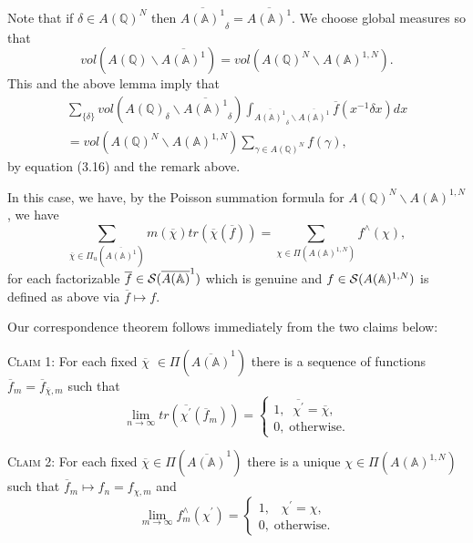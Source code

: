 Note that if $\delta\in A({\mathbb{Q}})^N$ then
$\overline{A({\mathbb{A}})^1}_\delta=\overline{A({\mathbb{A}})^1}$.
We choose global measures so that
\[
vol(A({\mathbb{Q}}) \backslash \overline{A({\mathbb{A}})^1})
=vol(A({\mathbb{Q}})^N \backslash A({\mathbb{A}})^{1,N}).
\]
This and the above lemma imply that 
\begin{equation}
\begin{array}{c}
\sum_{\{\delta \}}
vol(A({\mathbb{Q}})_\delta \backslash \overline{A({\mathbb{A}})^1}_{\delta })
\int_{\overline{A({\mathbb{A}})^1}_{\delta }\backslash 
\overline{A({\mathbb{A}})^1}}
\overline{f}(x^{-1}\delta x)dx \\ 
=vol(A({\mathbb{Q}})^N \backslash A({\mathbb{A}})^{1,N})
\sum_{\gamma \in A({\mathbb{Q}})^N}
f(\gamma ),
\end{array}
\end{equation}
by equation (3.16) and the remark above.

In this case, we have, by the Poisson summation formula for
$A({\mathbb{Q}})^N\backslash A({\mathbb{A}})^{1,N}$, we have 
\begin{equation}
\sum_{\overline{\chi }\in
\Pi_u (\overline{A({\mathbb{A}})^1})}m(\overline{\chi })
tr(\overline{\chi }(\overline{f}))
=\sum_{\chi \in \Pi (A({\mathbb{A}})^{1,N})}
f^{\wedge }(\chi ),
\end{equation}
for each factorizable
$\overline{f}\in {\cal{S}}(\overline{A({\mathbb{A}})}^1)$
which is genuine and $f\in {\cal{S}}(A({\mathbb{A}})^{1,N})$
is defined as above
via $\overline{f}\longmapsto f$.

Our correspondence theorem follows immediately from the two claims below:

\textsc{Claim 1}: For each fixed $\overline{\chi }$
$\in \Pi (\overline{A({\mathbb{A}})}^1)$ there is a sequence of
functions
$\overline{f}_m
=\overline{f}_{\overline{\chi },m}$ such that 
\[
\lim_{n\rightarrow \infty }
tr(\overline{\chi ^{\prime }}(\overline{f}_m))
=\left\{ 
\begin{array}{c}
1,\;\;\overline{\chi ^{\prime }}=\overline{\chi }, \\ 
0,\;\mathrm{otherwise}.
\end{array}
\right. 
\]

\textsc{Claim 2}: For each fixed
$\overline{\chi }\in \Pi (\overline{A({\mathbb{A}})}^1)$
there is a unique $\chi \in \Pi (A({\mathbb{A}})^{1,N})$ such that
$\overline{f}_m\longmapsto f_n=f_{\chi ,m}$ and 
\[
\lim_{m\rightarrow \infty }f_m^{\wedge }(\chi ^{\prime })=\left\{ 
\begin{array}{c}
1,\;\;\;\chi ^{\prime }=\chi , \\ 
0,\;\mathrm{otherwise}.
\end{array}
\right. 
\]

